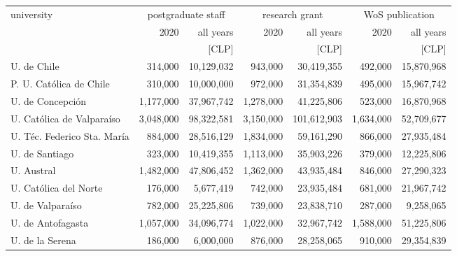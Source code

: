 \begin{tabular}{l rr rr rr}
\hline\hline
university                     & 
                          \multicolumn{2}{c}{postgraduate staff} & 
                                                                \multicolumn{2}{c}{research grant} & 
                                                                                                 \multicolumn{2}{c}{WoS publication} \\
                               &          2020 & all years       &          2020 & all years       &          2020 & all years       \\
                               &               & [CLP]           &               & [CLP]           &               & [CLP]           \\
\hline
U. de Chile                    &       314,000 &      10,129,032 &       943,000 &      30,419,355 &       492,000 &      15,870,968 \\
P. U. Católica de Chile        &       310,000 &      10,000,000 &       972,000 &      31,354,839 &       495,000 &      15,967,742 \\
U. de Concepción               &     1,177,000 &      37,967,742 &     1,278,000 &      41,225,806 &       523,000 &      16,870,968 \\
U. Católica de Valparaíso      &     3,048,000 &      98,322,581 &     3,150,000 &     101,612,903 &     1,634,000 &      52,709,677 \\
U. Téc. Federico Sta. María    &       884,000 &      28,516,129 &     1,834,000 &      59,161,290 &       866,000 &      27,935,484 \\
U. de Santiago                 &       323,000 &      10,419,355 &     1,113,000 &      35,903,226 &       379,000 &      12,225,806 \\
U. Austral                     &     1,482,000 &      47,806,452 &     1,362,000 &      43,935,484 &       846,000 &      27,290,323 \\
U. Católica del Norte          &       176,000 &       5,677,419 &       742,000 &      23,935,484 &       681,000 &      21,967,742 \\
U. de Valparaíso               &       782,000 &      25,225,806 &       739,000 &      23,838,710 &       287,000 &       9,258,065 \\
U. de Antofagasta              &     1,057,000 &      34,096,774 &     1,022,000 &      32,967,742 &     1,588,000 &      51,225,806 \\
U. de la Serena                &       186,000 &       6,000,000 &       876,000 &      28,258,065 &       910,000 &      29,354,839 \\

\end{tabular}
